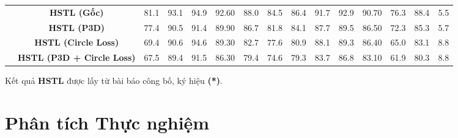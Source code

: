 \begin{table}[h]
{\begin{tabular}{c|c|ccccccccccc|c|c}
            \cline{2-15}                               & \textbf{HSTL (Gốc)}                           & 81.1                     & 93.1                    & 94.9             & 92.60            & 88.0             & 84.5             & 86.4             & 91.7             & 92.9             & 90.70            & 76.3             & 88.4             & 5.5             \\
            \cline{2-15}                               & \textbf{HSTL (P3D)}                           & 77.4                     & 90.5                    & 91.4             & 89.90            & 86.7             & 81.8             & 84.1             & 87.7             & 89.5             & 86.50            & 72.3             & 85.3             & 5.7             \\
                                                       & \textbf{HSTL (Circle Loss)}                   & 69.4                     & 90.6                    & 94.6             & 89.30            & 82.7             & 77.6             & 80.9             & 88.1             & 89.3             & 86.40            & 65.0             & 83.1             & 8.8             \\
                                                       & \textbf{HSTL (P3D + Circle Loss)}             & 67.5                     & 89.4                    & 91.5             & 86.30            & 79.4             & 74.6             & 79.3             & 83.7             & 86.8             & 83.10            & 61.9             & 80.3             & 8.8             \\
            \bottomrule
        \end{tabular}%
    }
    \label{tab:sota-cb}%
    Kết quả \textbf{HSTL}\cite{hstl} được lấy từ bài báo công bố, ký hiệu \textbf{(*)}.
\end{table}


\section{Phân tích Thực nghiệm}





